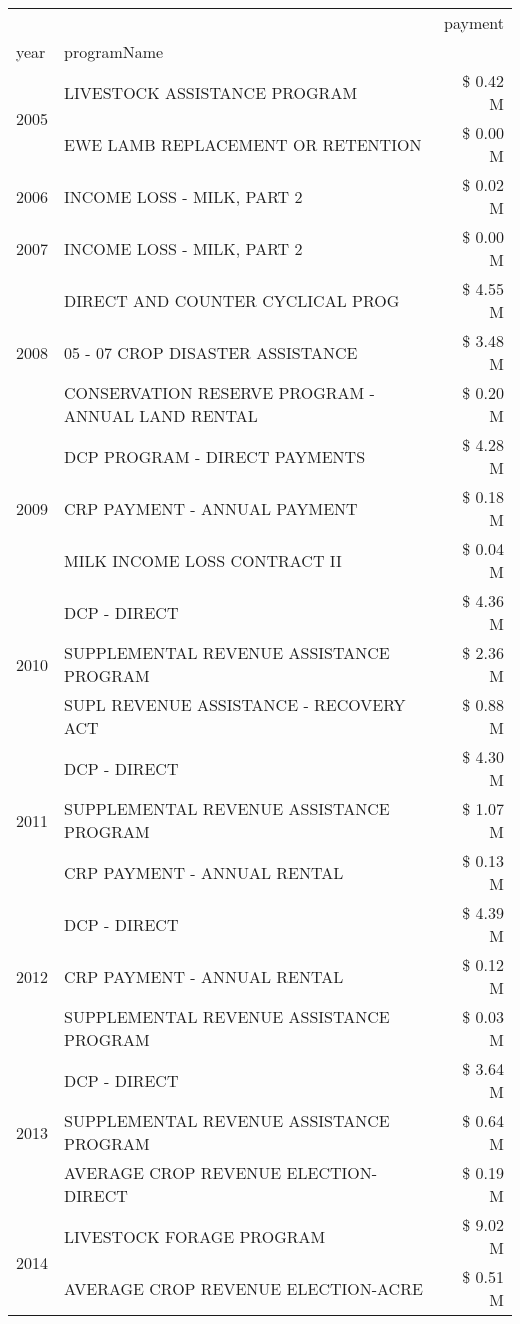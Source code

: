 \begin{tabular}{llr}
\toprule
 &  & payment \\
year & programName &  \\
\midrule
\multirow[t]{2}{*}{2005} & LIVESTOCK ASSISTANCE PROGRAM & \$ 0.42 M \\
 & EWE LAMB REPLACEMENT OR RETENTION & \$ 0.00 M \\
\cline{1-3}
2006 & INCOME LOSS - MILK, PART 2 & \$ 0.02 M \\
\cline{1-3}
2007 & INCOME LOSS - MILK, PART 2 & \$ 0.00 M \\
\cline{1-3}
\multirow[t]{3}{*}{2008} & DIRECT AND COUNTER CYCLICAL PROG & \$ 4.55 M \\
 & 05 - 07 CROP DISASTER ASSISTANCE & \$ 3.48 M \\
 & CONSERVATION RESERVE PROGRAM - ANNUAL LAND RENTAL & \$ 0.20 M \\
\cline{1-3}
\multirow[t]{3}{*}{2009} & DCP PROGRAM - DIRECT PAYMENTS & \$ 4.28 M \\
 & CRP PAYMENT - ANNUAL PAYMENT & \$ 0.18 M \\
 & MILK INCOME LOSS CONTRACT II & \$ 0.04 M \\
\cline{1-3}
\multirow[t]{3}{*}{2010} & DCP - DIRECT & \$ 4.36 M \\
 & SUPPLEMENTAL REVENUE ASSISTANCE PROGRAM & \$ 2.36 M \\
 & SUPL REVENUE ASSISTANCE - RECOVERY ACT & \$ 0.88 M \\
\cline{1-3}
\multirow[t]{3}{*}{2011} & DCP - DIRECT & \$ 4.30 M \\
 & SUPPLEMENTAL REVENUE ASSISTANCE PROGRAM & \$ 1.07 M \\
 & CRP PAYMENT - ANNUAL RENTAL & \$ 0.13 M \\
\cline{1-3}
\multirow[t]{3}{*}{2012} & DCP - DIRECT & \$ 4.39 M \\
 & CRP PAYMENT - ANNUAL RENTAL & \$ 0.12 M \\
 & SUPPLEMENTAL REVENUE ASSISTANCE PROGRAM & \$ 0.03 M \\
\cline{1-3}
\multirow[t]{3}{*}{2013} & DCP - DIRECT & \$ 3.64 M \\
 & SUPPLEMENTAL REVENUE ASSISTANCE PROGRAM & \$ 0.64 M \\
 & AVERAGE CROP REVENUE ELECTION-DIRECT & \$ 0.19 M \\
\cline{1-3}
\multirow[t]{3}{*}{2014} & LIVESTOCK FORAGE PROGRAM & \$ 9.02 M \\
 & AVERAGE CROP REVENUE ELECTION-ACRE & \$ 0.51 M \\

\end{tabular}
